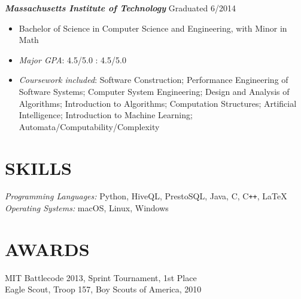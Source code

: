 \documentclass[margin]{res}
\begin{document}
\begin{resume}
                    {\sl \bf Massachusetts Institute of Technology} 
                    \hfill Graduated 6/2014
                    \begin{itemize} \itemsep -2pt %
                        \item Bachelor of Science in Computer Science
                        and Engineering, with Minor in Math
                        \item {\sl Major GPA}: 4.5/5.0  : 4.5/5.0 
                        \item {\sl Coursework included}:
                          Software Construction;
                          Performance Engineering of Software Systems; 
                          Computer System Engineering; 
                          Design and Analysis of Algorithms; 
                          Introduction to Algorithms;
                          Computation Structures;
                          Artificial Intelligence; 
                          Introduction to Machine Learning; 
                          Automata/Computability/Complexity
                    \end{itemize}

\section{SKILLS}    {\sl Programming Languages:} Python, HiveQL, PrestoSQL, Java, C,
                      C\texttt{++}, \LaTeX \\
                    {\sl Operating Systems:} macOS, Linux, Windows
 
 
\section{AWARDS}    MIT Battlecode 2013, Sprint Tournament, 1st Place\\
                    Eagle Scout, Troop 157, Boy Scouts of America, 2010

\end{resume}
\end{document}
